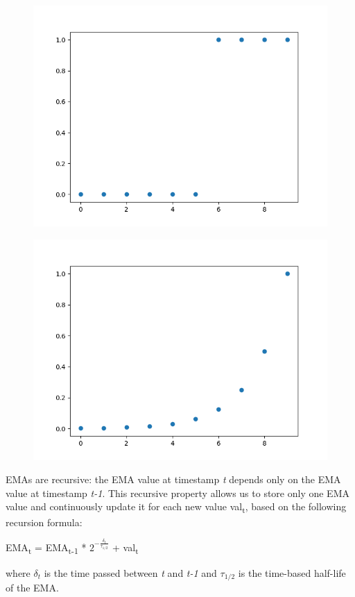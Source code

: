 \begin{figure}[!htb]
\centering
\begin{minipage}{.5\textwidth}
  \centering
      \includegraphics[scale=0.5]{figures/window-weights.png}
  \label{fig:window-weights}
\end{minipage}%
\begin{minipage}{.5\textwidth}
  \centering
      \includegraphics[scale=0.5]{figures/ema-weights.png}
  \label{fig:ema-weights}
\end{minipage}
\end{figure}


EMAs are recursive: the EMA value at timestamp \textit{t} depends only on the EMA value at timestamp \textit{t-1}. This recursive property allows us to store only one EMA value and continuously update it for each new value val\textsubscript{t}, based on the following recursion formula:
\begin{definition}
EMA\textsubscript{t} = EMA\textsubscript{t-1} * $2^{-\frac{\delta_t}{\tau_{1/2}}}$ + val\textsubscript{t}
\label{def:ema}
\end{definition}
where $\delta_t$ is the time passed between \textit{t} and \textit{t-1} and $\tau_{1/2}$ is the time-based half-life of the EMA. 

